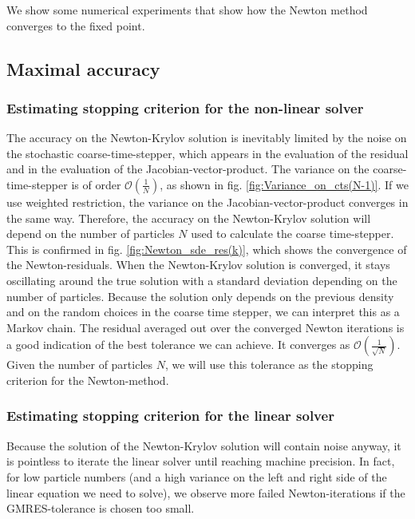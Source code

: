 


We show some numerical experiments that show how the Newton method converges to the fixed point. 

\subsection{Maximal accuracy}


\subsubsection{Estimating stopping criterion for the non-linear solver}
The accuracy on the Newton-Krylov solution is inevitably limited by the noise on the stochastic coarse-time-stepper, which appears in the evaluation of the residual and in the evaluation of the Jacobian-vector-product. The variance on the coarse-time-stepper is of order $\mathcal{O}(\frac{1}{N})$, as shown in fig. \ref{fig:Variance_on_cts(N-1)}. If we use weighted restriction, the variance on the Jacobian-vector-product converges in the same way.  Therefore, the accuracy on the Newton-Krylov solution will depend on the number of particles $N$ used to calculate the coarse time-stepper.  This is confirmed in fig. \ref{fig:Newton_sde_res(k)}, which shows the convergence of the Newton-residuals. When the Newton-Krylov solution is converged, it stays oscillating around the true solution with a standard deviation depending on the number of particles. Because the solution only depends on the previous density and on the random choices in the coarse time stepper, we can interpret this as a Markov chain. The residual averaged out over the converged Newton iterations is a good indication of the best tolerance we can achieve. It converges as $\mathcal{O}(\frac{1}{\sqrt{N}})$. Given the number of particles $N$,  we will use this tolerance as the stopping criterion for the Newton-method.

\subsubsection{Estimating stopping criterion for the linear solver}
Because the solution of the Newton-Krylov solution will contain noise anyway, it is pointless to iterate the linear solver until reaching machine precision.
In fact, for low particle numbers (and a high variance on the left and right side of the linear equation we need to solve), we observe more failed Newton-iterations if the GMRES-tolerance is chosen too small.  

